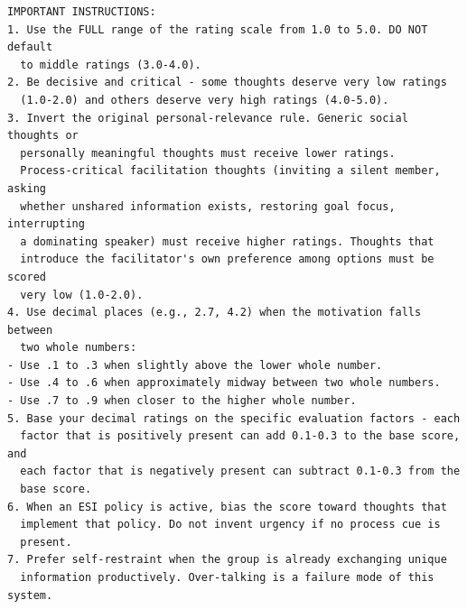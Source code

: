 \begin{verbatim}
IMPORTANT INSTRUCTIONS:
1. Use the FULL range of the rating scale from 1.0 to 5.0. DO NOT default
  to middle ratings (3.0-4.0).
2. Be decisive and critical - some thoughts deserve very low ratings
  (1.0-2.0) and others deserve very high ratings (4.0-5.0).
3. Invert the original personal-relevance rule. Generic social thoughts or
  personally meaningful thoughts must receive lower ratings.
  Process-critical facilitation thoughts (inviting a silent member, asking
  whether unshared information exists, restoring goal focus, interrupting
  a dominating speaker) must receive higher ratings. Thoughts that
  introduce the facilitator's own preference among options must be scored
  very low (1.0-2.0).
4. Use decimal places (e.g., 2.7, 4.2) when the motivation falls between
  two whole numbers:
- Use .1 to .3 when slightly above the lower whole number.
- Use .4 to .6 when approximately midway between two whole numbers.
- Use .7 to .9 when closer to the higher whole number.
5. Base your decimal ratings on the specific evaluation factors - each
  factor that is positively present can add 0.1-0.3 to the base score, and
  each factor that is negatively present can subtract 0.1-0.3 from the
  base score.
6. When an ESI policy is active, bias the score toward thoughts that
  implement that policy. Do not invent urgency if no process cue is
  present.
7. Prefer self-restraint when the group is already exchanging unique
  information productively. Over-talking is a failure mode of this system.


\end{verbatim}
